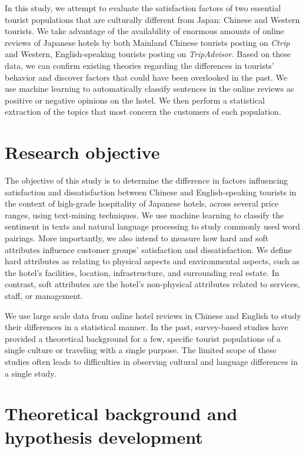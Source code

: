 \documentclass[smallextended,natbib]{svjour3}       %
\begin{document}
  In this study, we attempt to evaluate the satisfaction factors of two essential tourist populations that are culturally different from Japan: Chinese and Western tourists. We take advantage of the availability of enormous amounts of online reviews of Japanese hotels by both Mainland Chinese tourists posting on \textit{Ctrip} and Western, English-speaking tourists posting on \textit{TripAdvisor}. Based on these data, we can confirm existing theories regarding the differences in tourists’ behavior and discover factors that could have been overlooked in the past. We use machine learning to automatically classify sentences in the online reviews as positive or negative opinions on the hotel. We then perform a statistical extraction of the topics that most concern the customers of each population.

\section{Research objective}\label{research_objective}

  The objective of this study is to determine the difference in factors influencing satisfaction and dissatisfaction between Chinese and English-speaking tourists in the context of high-grade hospitality of Japanese hotels, across several price ranges, using text-mining techniques. We use machine learning to classify the sentiment in texts and natural language processing to study commonly used word pairings. More importantly, we also intend to measure how hard and soft attributes influence customer groups' satisfaction and dissatisfaction. We define hard attributes as relating to physical aspects and environmental aspects, such as the hotel's facilities, location, infrastructure, and surrounding real estate. In contrast, soft attributes are the hotel's non-physical attributes related to services, staff, or management.

  We use large scale data from online hotel reviews in Chinese and English to study their differences in a statistical manner. In the past, survey-based studies have provided a theoretical background for a few, specific tourist populations of a single culture or traveling with a single purpose. The limited scope of these studies often leads to difficulties in observing cultural and language differences in a single study.

\section{Theoretical background and hypothesis development}\label{theory_hypothesis}
\end{document}
